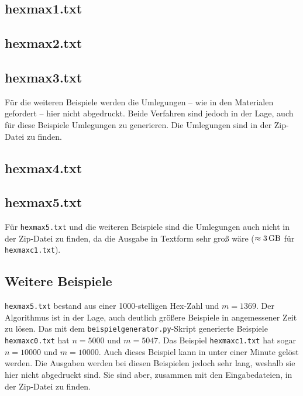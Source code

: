 \documentclass[a4paper,10pt,ngerman]{scrartcl}
\begin{document}
\subsection*{hexmax1.txt}

\subsection*{hexmax2.txt}

\subsection*{hexmax3.txt}
Für die weiteren Beispiele werden die Umlegungen -- wie in den Materialen gefordert -- hier nicht abgedruckt. 
Beide Verfahren sind jedoch in der Lage, auch für diese Beispiele Umlegungen zu generieren.
Die Umlegungen sind in der Zip-Datei zu finden.

\subsection*{hexmax4.txt}

\subsection*{hexmax5.txt}

Für \texttt{hexmax5.txt} und die weiteren Beispiele sind die Umlegungen auch nicht in der Zip-Datei zu finden, da die Ausgabe in Textform sehr groß wäre ($\approx \SI{3}{\giga\byte}$ für \texttt{hexmaxc1.txt}).

\subsection*{Weitere Beispiele}
\texttt{hexmax5.txt} bestand aus einer 1000-stelligen Hex-Zahl und $m = 1369$. Der Algorithmus ist in der Lage, auch deutlich größere Beispiele in angemessener Zeit zu lösen. Das mit dem \texttt{beispielgenerator.py}-Skript generierte Beispiele \texttt{hexmaxc0.txt} hat $n = 5000$ und $m = 5047$. Das Beispiel \texttt{hexmaxc1.txt} hat sogar $n = 10000$ und $m = 10000$. Auch dieses Beispiel kann in unter einer Minute gelöst werden. Die Ausgaben werden bei diesen Beispielen jedoch sehr lang, weshalb sie hier nicht abgedruckt sind.  Sie sind aber, zusammen mit den Eingabedateien, in der Zip-Datei zu finden.
\end{document}
